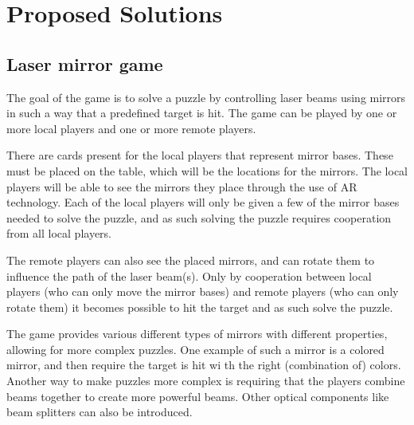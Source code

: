 \chapter{Proposed Solutions} \label{cha:solution}

\section{Laser mirror game}
	The goal of the game is to solve a puzzle by controlling laser beams 
	using mirrors in such a way that a predefined target is hit. The game 
	can be played by one or more local players and one or more remote players.
	
	There are cards present for the local players that represent mirror 
	bases. These must be placed on the table, which will be the locations 
	for the mirrors. The local players will be able to see the mirrors they 
	place through the use of AR technology. Each of the local players will 
	only be given a few of the mirror bases needed to solve the puzzle, and 
	as such solving the puzzle requires cooperation from all local players.
	
	The remote players can also see the placed mirrors, and can rotate them 
	to influence the path of the laser beam(s). Only by cooperation between 
	local players (who can only move the mirror bases) and remote players 
	(who can only rotate them) it becomes possible to hit the target and as 
	such solve the puzzle.
	
	The game provides various different types of mirrors with different 
	properties, allowing for more complex puzzles. One example of such a 
	mirror is a colored mirror, and then require the target is hit wi                                                                                                                                                                                                                                                                                                                                                                                                                                                                                                                                                                             th the 
	right (combination of) colors. Another way to make puzzles more complex 
	is requiring that the players combine beams together to create more 
	powerful beams. Other optical components like beam splitters can also be 
	introduced.
	

